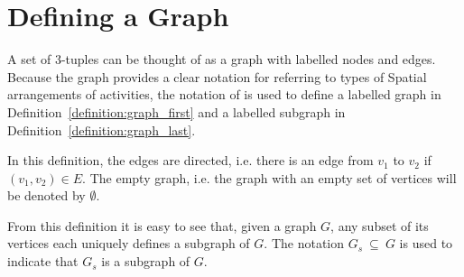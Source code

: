 \section{Defining a Graph}

A set of 3-tuples can be thought of as a graph with labelled nodes and
edges.  Because the graph provides a clear notation for referring to
types of Spatial arrangements of activities, the notation of
{\mbox{\cite{messmer:1995}}} is used to define a labelled graph in
{\mbox{Definition~\ref{definition:graph_first}}} and a labelled
subgraph in {\mbox{Definition~\ref{definition:graph_last}}}.

 \noindent In this definition, the edges are
directed, i.e. there is an edge from $v_1$ to $v_2$ if
$(v_1,v_2){\in}E$.  The empty graph, i.e. the graph with an empty set
of vertices will be denoted by $\emptyset$.

 \noindent From this definition it is easy to see
that, given a graph $G$, any subset of its vertices each uniquely
defines a subgraph of $G$.  The notation $G_s ~{\subseteq}~ G$ is used
to indicate that $G_s$ is a subgraph of $G$.

